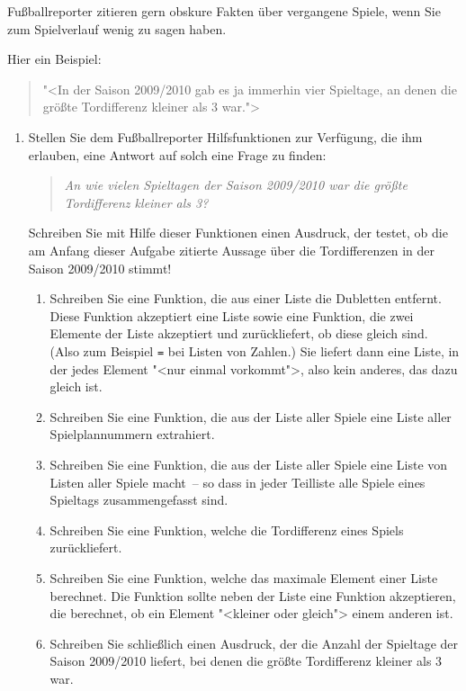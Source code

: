\begin{aufgabe}
  Fußballreporter zitieren gern obskure Fakten über
  vergangene Spiele, wenn Sie zum Spielverlauf wenig zu sagen haben.

  Hier ein Beispiel:
  \begin{quote}
    "<In der Saison 2009/2010 gab es ja immerhin vier Spieltage, an
    denen die größte Tordifferenz kleiner als 3 war.">
  \end{quote}
\begin{enumerate}
\item Stellen Sie dem Fußballreporter Hilfsfunktionen zur Verfügung,
  die ihm erlauben, eine Antwort auf solch eine Frage zu
  finden:
  \begin{quote}
    \emph{An wie vielen Spieltagen der Saison 2009/2010 war die größte
    Tordifferenz kleiner als 3?}
  \end{quote}
  Schreiben Sie mit Hilfe dieser Funktionen einen Ausdruck, der
  testet, ob die am Anfang dieser Aufgabe zitierte Aussage über die
  Tordifferenzen in der Saison 2009/2010 stimmt!

  \begin{enumerate}
  \item Schreiben Sie eine Funktion, die aus einer Liste die Dubletten
    entfernt.  Diese Funktion akzeptiert eine Liste sowie eine
    Funktion, die zwei Elemente der Liste akzeptiert und
    zurückliefert, ob diese gleich sind.  (Also zum Beispiel
    \texttt{=} bei Listen von Zahlen.)  Sie liefert dann eine Liste,
    in der jedes Element "<nur einmal vorkommt">, also kein anderes,
    das dazu gleich ist.
  \item Schreiben Sie eine Funktion, die aus der Liste aller Spiele
    eine Liste aller Spielplannummern extrahiert.
  \item Schreiben Sie eine Funktion, die aus der Liste aller Spiele
    eine Liste von Listen aller Spiele macht~-- so dass in jeder
    Teilliste alle Spiele eines Spieltags zusammengefasst sind.
  \item Schreiben Sie eine Funktion, welche die Tordifferenz eines
    Spiels zurückliefert.
  \item Schreiben Sie eine Funktion, welche das maximale Element einer
    Liste berechnet.  Die Funktion sollte neben der Liste eine
    Funktion akzeptieren, die berechnet, ob ein Element "<kleiner oder
    gleich"> einem anderen ist.
  \item Schreiben Sie schließlich einen Ausdruck, der die Anzahl der
    Spieltage der Saison 2009/2010 liefert, bei denen die größte
    Tordifferenz kleiner als 3 war.
  \end{enumerate}


\end{enumerate}
\end{aufgabe}
